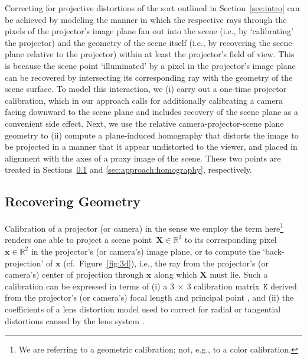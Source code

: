 \documentclass[review]{elsarticle}
\begin{document}
Correcting for projective distortions of the sort outlined in Section~\ref{sec:intro} can be achieved by modeling the manner in which the respective rays through the pixels of the projector's image plane fan out into the scene (i.e., by `calibrating' the projector) and the geometry of the scene itself (i.e., by recovering the scene plane relative to the projector) within at least the projector's field of view. This is because the scene point `illuminated' by a pixel in the projector's image plane can be recovered by intersecting its corresponding ray with the geometry of the scene surface. To model this interaction, we (i) carry out a one-time projector calibration, which in our approach calls for additionally calibrating a camera facing downward to the scene plane and includes recovery of the scene plane as a convenient side effect. Next, we use the relative camera-projector-scene plane geometry to (ii) compute a plane-induced homography that distorts the image to be projected in a manner that it appear undistorted to the viewer, and placed in alignment with the axes of a proxy image of the scene. These two points are treated in Sections~\ref{sec:approach:geometry} and \ref{sec:approach:homography}, respectively.

\subsection{Recovering Geometry}\label{sec:approach:geometry}

Calibration of a projector (or camera) in the sense we employ the term here\footnote{We are referring to a geometric calibration; not, e.g., to a color calibration.} renders one able to project a scene point~$\mathbf{X} \in \mathbb{R}^3$ to its corresponding pixel~$\mathbf{x} \in \mathbb{R}^2$ in the projector's (or camera's) image plane, or to compute the `back-projection' of $\mathbf{x}$ (cf.\ Figure~\ref{fig:3d}), i.e., the ray from the projector's (or camera's) center of projection through $\mathbf{x}$ along which $\mathbf{X}$ must lie. Such a calibration can be expressed in terms of (i) a $3~\times{}~3$ calibration matrix~$\mathtt{K}$ derived from the projector's (or camera's) focal length and principal point \cite{Hartley2004}, and (ii) the coefficients of a lens distortion model used to correct for radial or tangential distortions caused by the lens system \cite{duane1971close}.
\end{document}
